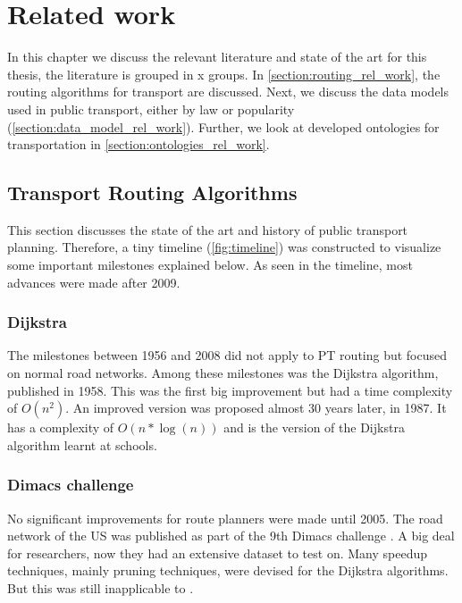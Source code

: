 \chapter{Related work}
\label{chap:rel_work}
In this chapter we discuss the relevant literature and state of the art for this thesis, the literature is grouped in x groups. In \autoref{section:routing_rel_work}, the routing algorithms for transport are discussed. Next, we discuss the data models used in public transport, either by law or popularity (\autoref{section:data_model_rel_work}). Further, we look at developed ontologies for transportation in \autoref{section:ontologies_rel_work}.

\section{Transport Routing Algorithms }\label{section:routing_rel_work}



This section discusses the state of the art and history of public transport planning. Therefore, a tiny timeline (\autoref{fig:timeline}) was constructed to visualize some important milestones explained below. As seen in the timeline, most advances were made after 2009.

\subsection{Dijkstra}
The milestones between 1956 and 2008 did not apply to PT routing but focused on normal road networks. Among these milestones was the Dijkstra algorithm, published in 1958. This was the first big improvement but had a time complexity of $O(n^2)$. An improved version was proposed almost 30 years later, in 1987. It has a complexity of $O(n*\log(n))$ and is the version of the Dijkstra algorithm learnt at schools.%
\subsection{Dimacs challenge}
No significant improvements for route planners were made until 2005. The road network of the US was published as part of the 9th Dimacs challenge \cite{noauthor_9th_2017}. A big deal for researchers, now they had an extensive dataset to test on. Many speedup techniques, mainly pruning techniques, were devised for the Dijkstra algorithms. But this was still inapplicable to .

